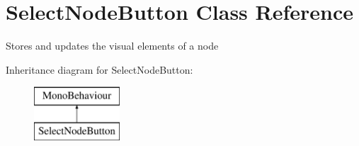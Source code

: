 \hypertarget{class_select_node_button}{}\section{Select\+Node\+Button Class Reference}
\label{class_select_node_button}


Stores and updates the visual elements of a node  


Inheritance diagram for Select\+Node\+Button\+:\begin{figure}[H]
\begin{center}
\leavevmode
\includegraphics[height=2.000000cm]{class_select_node_button}
\end{center}
\end{figure}
